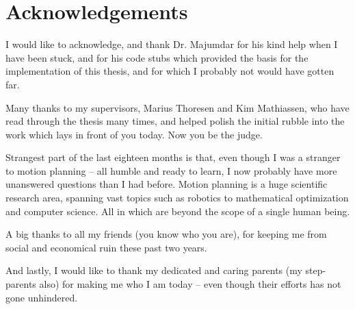 \chapter{Acknowledgements}

I would like to acknowledge, and thank Dr. Majumdar for his kind help when I
have been stuck, and for his code stubs which provided the basis for the
implementation of this thesis, and for which I probably not would have gotten far.

Many thanks to my supervisors, Marius Thoresen and Kim Mathiassen, who have read
through the thesis many times, and helped polish the initial rubble into the
work which lays in front of you today. Now you be the judge.

Strangest part of the last eighteen months is that, even though I was a stranger
to motion planning -- all humble and ready to learn, I now probably have more
unanswered questions than I had before. Motion planning is a huge scientific
research area, spanning vast topics such as robotics to mathematical optimization
and computer science. All in which are beyond the scope of a single human being.

A big thanks to all my friends (you know who you are), for keeping me from
social and economical ruin these past two years.

And lastly, I would like to thank my dedicated and caring parents (my
step-parents also) for making me who I am today -- even though their efforts has
not gone unhindered.
